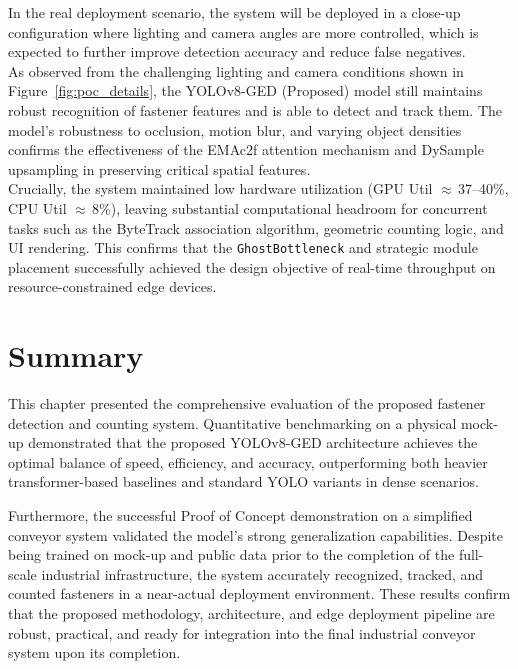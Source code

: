 In the real deployment scenario, the system will be deployed in a close-up configuration where lighting and camera angles are more controlled, which is expected to further improve detection accuracy and reduce false negatives. \\

As observed from the challenging lighting and camera conditions shown in Figure~\ref{fig:poc_details}, the YOLOv8-GED (Proposed) model still maintains robust recognition of fastener features and is able to detect and track them. The model's robustness to occlusion, motion blur, and varying object densities confirms the effectiveness of the EMAc2f attention mechanism and DySample upsampling in preserving critical spatial features.\\

Crucially, the system maintained low hardware utilization (GPU Util $\approx$\,37--40\%, CPU Util $\approx$\,8\%), leaving substantial computational headroom for concurrent tasks such as the ByteTrack association algorithm, geometric counting logic, and UI rendering. This confirms that the \texttt{GhostBottleneck} and strategic module placement successfully achieved the design objective of real-time throughput on resource-constrained edge devices.

\section{Summary}
This chapter presented the comprehensive evaluation of the proposed fastener detection and counting system. Quantitative benchmarking on a physical mock-up demonstrated that the proposed YOLOv8-GED architecture achieves the optimal balance of speed, efficiency, and accuracy, outperforming both heavier transformer-based baselines and standard YOLO variants in dense scenarios.

Furthermore, the successful Proof of Concept demonstration on a simplified conveyor system validated the model's strong generalization capabilities. Despite being trained on mock-up and public data prior to the completion of the full-scale industrial infrastructure, the system accurately recognized, tracked, and counted fasteners in a near-actual deployment environment. These results confirm that the proposed methodology, architecture, and edge deployment pipeline are robust, practical, and ready for integration into the final industrial conveyor system upon its completion.